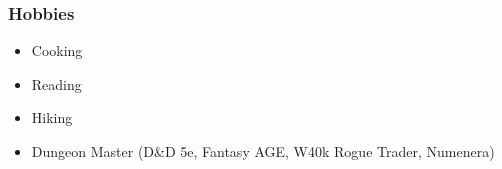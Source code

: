		\subsubsection{Hobbies}
			\begin{itemize}
				\item Cooking
				\item Reading
				\item Hiking
				\item Dungeon Master (D\&D 5e, Fantasy AGE, W40k Rogue Trader, Numenera)
			\end{itemize}